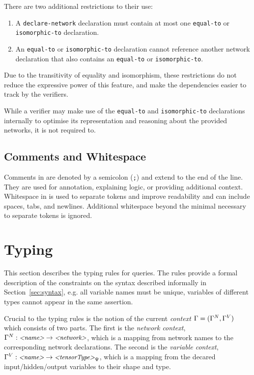 There are two additional restrictions to their use:
\begin{enumerate}
\item A \texttt{declare-network} declaration must contain at most one \texttt{equal-to} or \texttt{isomorphic-to} declaration.
\item An \texttt{equal-to} or \texttt{isomorphic-to} declaration cannot reference another network declaration that also contains an \texttt{equal-to} or \texttt{isomorphic-to}. 
\end{enumerate}
Due to the transitivity of equality and isomorphism, these restrictions do not reduce the expressive power of this feature, and make the dependencies easier to track by the verifiers.

While a verifier may make use of the \texttt{equal-to} and \texttt{isomorphic-to} declarations internally to optimise its representation and reasoning about the provided networks, it is not required to.



\subsection{Comments and Whitespace}

Comments in \vnnlib{} are denoted by a semicolon (\texttt{;}) and extend to the end of the line. They are used for annotation, explaining logic, or providing additional context. Whitespace in \vnnlib{} is used to separate tokens and improve readability and can include spaces, tabs, and newlines. Additional whitespace beyond the minimal necessary to separate tokens is ignored.


\section{Typing}
\label{sec:scoping_and_typing}

This section describes the typing rules for \vnnlib{} queries. The rules provide a formal description of the constraints on the syntax described informally in Section~\ref{sec:syntax}, e.g. all variable names must be unique, variables of different types cannot appear in the same assertion. 

Crucial to the typing rules is the notion of the current \emph{context} $\Gamma = (\Gamma^N, \Gamma^V)$ which consists of two parts. The first is the \emph{network context}, $\Gamma^N : \text{\small \textit{<name>}} \rightarrow \text{\small \textit{<network>}}$, which is a mapping from network names to the corresponding network declarations. The second is the \emph{variable context}, $\Gamma^V : \text{\small \textit{<name>}} \rightarrow \text{\small \textit{<tensorType>}}_\Psi$, which is a mapping from the decared input/hidden/output variables to their shape and type.

